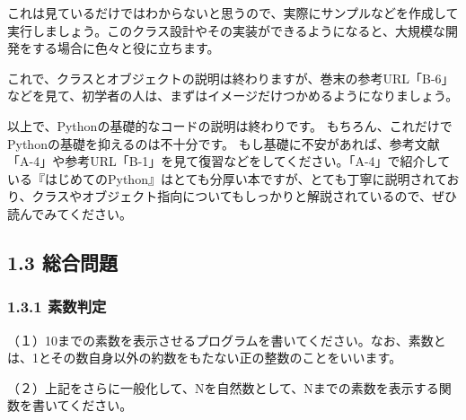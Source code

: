 \documentclass[11pt]{article}
\begin{document}
    これは見ているだけではわからないと思うので、実際にサンプルなどを作成して実行しましょう。このクラス設計やその実装ができるようになると、大規模な開発をする場合に色々と役に立ちます。

これで、クラスとオブジェクトの説明は終わりますが、巻末の参考URL「B-6」などを見て、初学者の人は、まずはイメージだけつかめるようになりましょう。

    以上で、Pythonの基礎的なコードの説明は終わりです。
もちろん、これだけでPythonの基礎を抑えるのは不十分です。
もし基礎に不安があれば、参考文献「A-4」や参考URL「B-1」を見て復習などをしてください。「A-4」で紹介している『はじめてのPython』はとても分厚い本ですが、とても丁寧に説明されており、クラスやオブジェクト指向についてもしっかりと解説されているので、ぜひ読んでみてください。

    \subsection{1.3 総合問題}\label{ux7dcfux5408ux554fux984c}

    \subsubsection{1.3.1 素数判定}\label{ux7d20ux6570ux5224ux5b9a}

（１）10までの素数を表示させるプログラムを書いてください。なお、素数とは、1とその数自身以外の約数をもたない正の整数のことをいいます。

（２）上記をさらに一般化して、Nを自然数として、Nまでの素数を表示する関数を書いてください。


    
    
    
    
\end{document}
